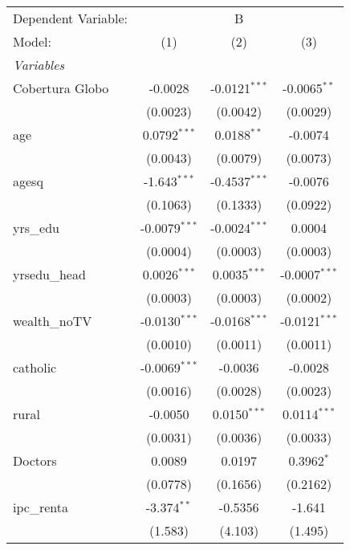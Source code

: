 
\begingroup
\centering
\begin{tabular}{lccc}
   \tabularnewline \midrule \midrule
   Dependent Variable: & \multicolumn{3}{c}{B}\\
   Model:          & (1)             & (2)             & (3)\\  
   \midrule
   \emph{Variables}\\
   Cobertura Globo & -0.0028         & -0.0121$^{***}$ & -0.0065$^{**}$\\   
                   & (0.0023)        & (0.0042)        & (0.0029)\\   
   age             & 0.0792$^{***}$  & 0.0188$^{**}$   & -0.0074\\   
                   & (0.0043)        & (0.0079)        & (0.0073)\\   
   agesq           & -1.643$^{***}$  & -0.4537$^{***}$ & -0.0076\\   
                   & (0.1063)        & (0.1333)        & (0.0922)\\   
   yrs\_edu        & -0.0079$^{***}$ & -0.0024$^{***}$ & 0.0004\\   
                   & (0.0004)        & (0.0003)        & (0.0003)\\   
   yrsedu\_head    & 0.0026$^{***}$  & 0.0035$^{***}$  & -0.0007$^{***}$\\   
                   & (0.0003)        & (0.0003)        & (0.0002)\\   
   wealth\_noTV    & -0.0130$^{***}$ & -0.0168$^{***}$ & -0.0121$^{***}$\\   
                   & (0.0010)        & (0.0011)        & (0.0011)\\   
   catholic        & -0.0069$^{***}$ & -0.0036         & -0.0028\\   
                   & (0.0016)        & (0.0028)        & (0.0023)\\   
   rural           & -0.0050         & 0.0150$^{***}$  & 0.0114$^{***}$\\   
                   & (0.0031)        & (0.0036)        & (0.0033)\\   
   Doctors         & 0.0089          & 0.0197          & 0.3962$^{*}$\\   
                   & (0.0778)        & (0.1656)        & (0.2162)\\   
   ipc\_renta      & -3.374$^{**}$   & -0.5356         & -1.641\\   
                   & (1.583)         & (4.103)         & (1.495)\\   

\end{tabular}

